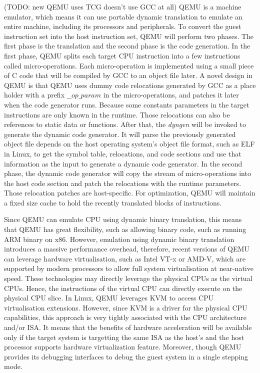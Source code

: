 (TODO: new QEMU uses TCG doesn't use GCC at all)
QEMU is a machine emulator, which means it can use portable dynamic translation to emulate an entire machine, including its processors and peripherals. To convert the guest instruction set into the host instruction set, QEMU will perform two phases. The first phase is the translation and the second phase is the code generation. In the first phase, QEMU splits each target CPU instruction into a few instructions called micro-operations. Each micro-operation is implemented using a small piece of C code that will be compiled by GCC to an object file later. A novel design in QEMU is that QEMU uses dummy code relocations generated by GCC as a place holder with a prefix \emph{$\_\_op\_param$} in the micro-operations, and patches it later when the code generator runs. Because some constants parameters in the target instructions are only known in the runtime. Those relocations can also be references to static data or functions. After that, the \emph{dyngen} will be invoked to generate the dynamic code generator. It will parse the previously generated object file depends on the host operating system's object file format, such as ELF in Linux, to get the symbol table, relocations, and code sections and use that information as the input to generate a dynamic code generator. In the second phase, the dynamic code generator will copy the stream of micro-operations into the host code section and patch the relocations with the runtime parameters. Those relocation patches are host-specific. For optimization, QEMU will maintain a fixed size cache to hold the recently translated blocks of instructions. 

Since QEMU can emulate CPU using dynamic binary translation, this means that QEMU has great flexibility, such as allowing binary code, such as running ARM binary on x86. However, emulation using dynamic binary translation introduces a massive performance overhead, therefore, recent versions of QEMU can leverage hardware virtualisation, such as Intel VT-x or AMD-V, which are supported by modern processors to allow full system virtualisation at near-native speed. These technologies may directly leverage the physical CPUs as the virtual CPUs. Hence, the instructions of the virtual CPU can directly execute on the physical CPU slice. In Linux, QEMU leverages KVM to access CPU virtualisation extensions. However, since KVM is a driver for the physical CPU capabilities, this approach is very tightly associated with the CPU architecture and/or ISA. It means that the benefits of hardware acceleration will be available only if the target system is targetting the same ISA as the host's and the host processor supports hardware virtualization feature. Moreover, though QEMU provides its debugging interfaces to debug the guest system in a single stepping mode.

